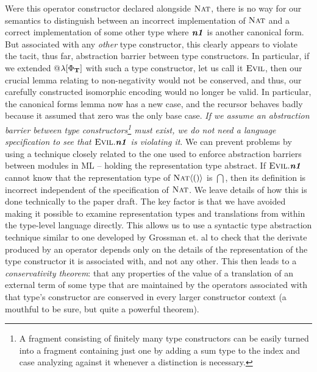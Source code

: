 Were this operator constructor declared alongside $\textsc{Nat}$, there is no way for our semantics to distinguish between an incorrect implementation of $\textsc{Nat}$ and a correct implementation of some other type where $\textbf{\textit{n1}}$ is another canonical form. But associated with any \emph{other} type constructor, this clearly appears to violate the tacit, thus far, abstraction barrier between type constructors. In particular, if we extended @$\lambda[\Phi_{\mathbf{T}}]$ with such a type constructor, let us call it $\textsc{Evil}$, then our crucial lemma relating to non-negativity would not be conserved, and thus, our carefully constructed isomorphic  encoding would no longer be valid. In particular, the canonical forms lemma now has a new case, and the recursor behaves badly because it assumed that zero was the only base case. \emph{If we assume an abstraction barrier between type constructors\footnote{A fragment consisting of finitely many type constructors can be easily turned into a fragment containing just one by adding a sum type to the index and case analyzing against it whenever a distinction is necessary.} must exist, we do not need a language specification to see that $\textsc{Evil}.\textbf{\textit{n1}}$ is violating it}. We can prevent problems by using a technique closely related to the one used to enforce abstraction barriers between modules in ML -- holding the representation type abstract. If $\textsc{Evil}.\textbf{\textit{n1}}$ cannot know that the representation type of $\textsc{Nat}\langle()\rangle$ is $\dint$, then its definition is incorrect independent of the specification of $\textsc{Nat}$. We leave details of how this is done technically to the paper draft. The key factor is that we have avoided making it possible to examine representation types and translations from within the type-level language directly. This allows us to use a syntactic type abstraction technique similar to one developed by Grossman et. al \cite{journals/toplas/GrossmanMZ00} to check that the derivate produced by an operator depends only on the details of the representation of the type constructor it is associated with, and not any other. This then leads to a \emph{conservativity theorem}: that any properties of the value of a translation of an external term of some type that are maintained by the operators associated with that type's constructor are conserved in every larger constructor context (a mouthful to be sure, but quite a powerful theorem).

